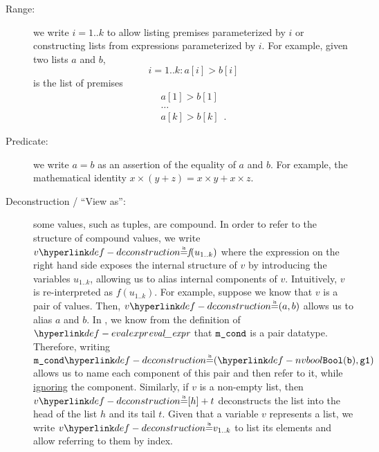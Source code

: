\begin{description}
  \item[Range:] we write $i=1..k$ to allow listing premises parameterized by $i$ or constructing
  lists from expressions parameterized by $i$.
  For example, given two lists $a$ and $b$,
  \[
    i=1..k: a[i] > b[i]
  \]
  is the list of premises
  \[
    \begin{array}{l}
    a[1] > b[1]\\
    \ldots\\
    a[k] > b[k] \enspace.
    \end{array}
  \]

  \item[Predicate:] we write $a = b$ as an assertion of the equality of $a$ and $b$.
  For example, the mathematical identity $x \times (y + z) = x \times y + x \times z$.

  \hypertarget{def-deconstruction}{}
  \item[Deconstruction / ``View as'':] some values, such as tuples, are compound. In order to refer to the structure
  of compound values, we write $v \eqname \textit{f}(u_{1..k})$ where the expression on the right
  hand side exposes the internal structure of $v$ by introducing the variables
  $u_{1..k}$, allowing us to alias internal components of $v$.
  Intuitively, $v$ is re-interpreted as $\textit{f}(u_{1..k})$.
  For example, suppose we know that $v$ is a pair of values.
  Then, $v \eqname (a, b)$ allows us to alias $a$ and $b$.
  In , we know from the definition of $\evalexpr$ that
  $\texttt{m\_cond}$ is a pair datatype.
  Therefore, writing $\mcond \eqname (\nvbool(\vb), \vgone)$ allows us to name each component of this pair
  and then refer to it, while \hyperlink{def-ignore}{ignoring} the \staticenvironmentterm{} component.
  Similarly, if $v$ is a non-empty list, then $v \eqname [h] + t$ deconstructs the list into the
  head of the list $h$ and its tail $t$.
  Given that a variable $v$ represents a list, we write $v \eqname v_{1..k}$ to list its elements and allow
  referring to them by index.


\end{description}
